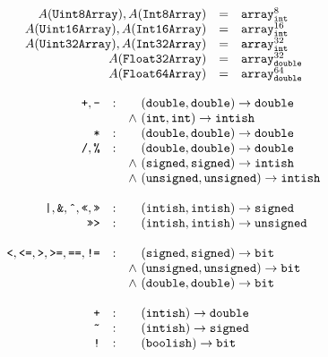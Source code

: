 \documentclass{article}
\newcommand{\funty}[2]{({#1}) \rightarrow {#2}}
\newcommand{\mathjs}[1]{\mbox{\texttt{{#1}}}}
\newcommand{\mathjssm}[1]{\mbox{\texttt{\scriptsize {#1}}}}
\newcommand{\bit}{\mathtt{bit}}
\newcommand{\unsigned}{\mathtt{unsigned}}
\newcommand{\intsm}{\mathjssm{int}}
\newcommand{\doublesm}{\mathjssm{double}}
\newcommand{\signed}{\mathtt{signed}}
\newcommand{\double}{\mathtt{double}}
\newcommand{\arr}[2]{\mathtt{array}^{#1}_{#2}}
\renewcommand{\int}{\mathtt{int}}
\newcommand{\boolish}{\mathtt{boolish}}
\newcommand{\intish}{\mathtt{intish}}
\begin{document}
\[
\begin{array}{rcl}
A(\mathtt{Uint8Array}), A(\mathtt{Int8Array})   & = & \arr{8}{\intsm} \\
A(\mathtt{Uint16Array}), A(\mathtt{Int16Array}) & = & \arr{16}{\intsm} \\
A(\mathtt{Uint32Array}), A(\mathtt{Int32Array}) & = & \arr{32}{\intsm} \\
A(\mathtt{Float32Array})                        & = & \arr{32}{\doublesm} \\
A(\mathtt{Float64Array})                        & = & \arr{64}{\doublesm} \\
\end{array}
\]

\[
\begin{array}{rcc@{\ }l}
\mathjs{+}, \mathjs{-}
                 & : &       & \funty{\double, \double}{\double} \\
                 &   & \land & \funty{\int, \int}{\intish} \\
\mathjs{*}       & : &       & \funty{\double, \double}{\double} \\
\mathjs{/}, \mathjs{\%}
                 & : &       & \funty{\double, \double}{\double} \\
                 &   & \land & \funty{\signed, \signed}{\intish}  \\
                 &   & \land & \funty{\unsigned, \unsigned}{\intish} \\
\\
\mathjs{|}, \mathjs{\&}, \mathjs{\^{}}, \mathjs{<<}, \mathjs{>>}
                 & : &       & \funty{\intish, \intish}{\signed} \\
\mathjs{>>>}     & : &       & \funty{\intish, \intish}{\unsigned} \\
\\
\mathjs{<}, \mathjs{<=}, \mathjs{>}, \mathjs{>=}, \mathjs{==}, \mathjs{!=}
                 & : &       & \funty{\signed, \signed}{\bit} \\
                 &   & \land & \funty{\unsigned, \unsigned}{\bit} \\
                 &   & \land & \funty{\double, \double}{\bit} \\
\\
\mathjs{+}       & : &       & \funty{\intish}{\double} \\
\mathjs{\~{}}    & : &       & \funty{\intish}{\signed} \\
\mathjs{!}       & : &       & \funty{\boolish}{\bit} \\
\end{array}
\]
\end{document}
